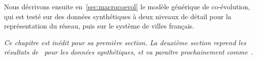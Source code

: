 Nous décrivons ensuite en~\ref{sec:macrocoevol} le modèle générique de co-évolution, qui est testé sur des données synthétiques à deux niveaux de détail pour la représentation du réseau, puis sur le système de villes français.



\stars


\textit{Ce chapitre est inédit pour sa première section. La deuxième section reprend les résultats de~\cite{raimbault2017macro} pour les données synthétiques, et va paraître prochainement comme~\cite{raimbault2018models}.
}














